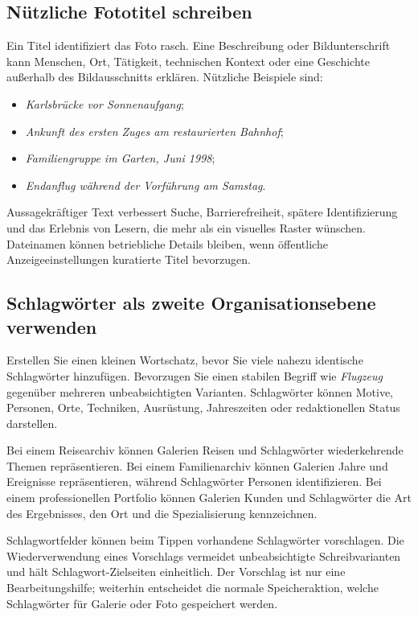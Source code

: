 \documentclass[11pt,a4paper]{article}
\begin{document}
\subsection{Nützliche Fototitel schreiben}

Ein Titel identifiziert das Foto rasch. Eine Beschreibung oder Bildunterschrift
kann Menschen, Ort, Tätigkeit, technischen Kontext oder eine Geschichte
außerhalb des Bildausschnitts erklären. Nützliche Beispiele sind:

\begin{itemize}
  \item \emph{Karlsbrücke vor Sonnenaufgang};
  \item \emph{Ankunft des ersten Zuges am restaurierten Bahnhof};
  \item \emph{Familiengruppe im Garten, Juni 1998};
  \item \emph{Endanflug während der Vorführung am Samstag}.
\end{itemize}

Aussagekräftiger Text verbessert Suche, Barrierefreiheit, spätere
Identifizierung und das Erlebnis von Lesern, die mehr als ein visuelles Raster
wünschen. Dateinamen können betriebliche Details bleiben, wenn öffentliche
Anzeigeeinstellungen kuratierte Titel bevorzugen.

\subsection{Schlagwörter als zweite Organisationsebene verwenden}

Erstellen Sie einen kleinen Wortschatz, bevor Sie viele nahezu identische
Schlagwörter hinzufügen. Bevorzugen Sie einen stabilen Begriff wie
\emph{Flugzeug} gegenüber mehreren unbeabsichtigten Varianten. Schlagwörter
können Motive, Personen, Orte, Techniken, Ausrüstung, Jahreszeiten oder
redaktionellen Status darstellen.

Bei einem Reisearchiv können Galerien Reisen und Schlagwörter wiederkehrende
Themen repräsentieren. Bei einem Familienarchiv können Galerien Jahre und
Ereignisse repräsentieren, während Schlagwörter Personen identifizieren. Bei
einem professionellen Portfolio können Galerien Kunden und Schlagwörter die Art
des Ergebnisses, den Ort und die Spezialisierung kennzeichnen.

Schlagwortfelder können beim Tippen vorhandene Schlagwörter vorschlagen. Die
Wiederverwendung eines Vorschlags vermeidet unbeabsichtigte Schreibvarianten und
hält Schlagwort-Zielseiten einheitlich. Der Vorschlag ist nur eine
Bearbeitungshilfe; weiterhin entscheidet die normale Speicheraktion, welche
Schlagwörter für Galerie oder Foto gespeichert werden.
\end{document}
